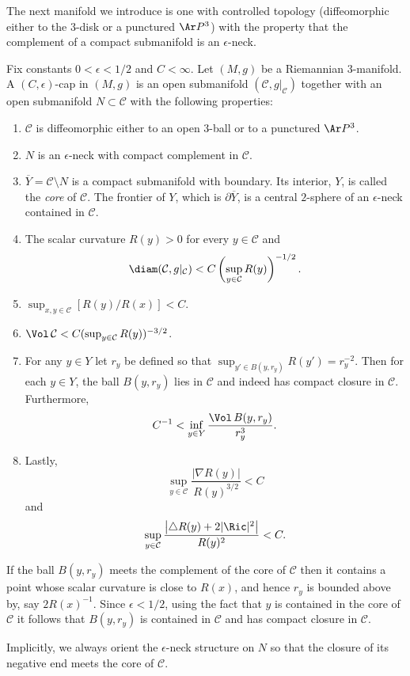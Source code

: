 The next manifold we introduce is one with controlled topology
(diffeomorphic either to the $3$-disk or a punctured $\Ar P^3$) with
the property that the complement of a compact submanifold is an
$\epsilon$-neck.

\begin{definition}\label{def:c-epsilon-cap}
\label{epscap}
Fix constants $0<\epsilon<1/2$ and $C<\infty$. Let $(M,g)$ be a
Riemannian $3$-manifold. A $(C,\epsilon)$-cap in $(M,g)$ is an open
submanifold $({\mathcal C},g|_{\mathcal C})$ together with an open
submanifold $N\subset {\mathcal C}$ with the following properties:
\begin{enumerate}
\item[(1)] ${\mathcal C}$ is diffeomorphic either to an open $3$-ball or to a
punctured $\Ar P^3$.
\item[(2)] $N$ is an $\epsilon$-neck with compact complement in
${\mathcal C}$.
\item[(3)] $\overline Y={\mathcal C}\setminus N$ is a compact submanifold with boundary.
Its  interior, $Y$, is called
 the {\em core} of ${\mathcal C}$. The frontier of $Y$, which is $\partial \overline Y$,
  is a central
 $2$-sphere of an $\epsilon$-neck contained in ${\mathcal C}$.
\item[(4)] The scalar curvature $R(y)>0$ for every $y\in {\mathcal C}$ and
$$ \diam({\mathcal C},g|_{\mathcal C})< C \left(\sup_{y\in
{\mathcal C}}R(y)\right)^{-1/2}.$$
\item[(5)] $\sup_{x,y\in {\mathcal C}}\left[ R(y)/R(x)\right]< C$.
\item[(6)]  $\Vol\,{\mathcal C} < C(\sup_{y\in {\mathcal C}}R(y))^{-3/2}$.
\item[(7)] For any $y\in Y$  let $r_y$ be defined so
that $\sup_{y'\in B(y,r_y)}R(y')=r_y^{-2}$. Then for each $y\in
Y$, the ball $B(y,r_y)$ lies in ${\mathcal C}$ and indeed has
compact closure in ${\mathcal C}$. Furthermore,
$$C^{-1}<\inf_{y\in
Y}\frac{\Vol\,B(y,r_y)}{r_y^3}.$$
\item[(8)] Lastly,
$$\sup_{y\in {\mathcal C}}\frac{|\nabla R(y)|}{R(y)^{3/2}}<C$$
and
$$\sup_{y\in {\mathcal C}}\frac{\left|\triangle R(y)+2|\Ric|^2\right|}{R(y)^2}<C.$$
\end{enumerate}
\end{definition}

\begin{remark}\label{rem:cap-core-ball-remark}
If the ball $B(y,r_y)$ meets the complement of the core of
${\mathcal C}$ then it contains a point whose scalar curvature is
close to $R(x)$, and hence $r_y$ is bounded above by, say
$2R(x)^{-1}$. Since $\epsilon<1/2$, using the fact that $y$ is
contained in the core of ${\mathcal C}$ it follows that $B(y,r_y)$
is contained in ${\mathcal C}$ and has compact closure in ${\mathcal
C}$.

Implicitly, we always orient the $\epsilon$-neck structure on $N$ so
that the closure of its negative end meets the core of ${\mathcal
C}$.
\end{remark}

